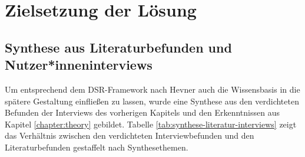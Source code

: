\section{Zielsetzung der Lösung}
\label{sec:Ergebnisse_Phase_zwei}

\subsection{Synthese aus Literaturbefunden und Nutzer*inneninterviews}
\label{subsec:Ergebnisse_Synthese}

Um entsprechend dem DSR-Framework nach Hevner \cite{hevner2004design} auch die Wissensbasis in die spätere Gestaltung einfließen zu lassen, wurde eine Synthese aus den verdichteten Befunden der Interviews des vorherigen Kapitels und den Erkenntnissen aus Kapitel \ref{chapter:theory} gebildet. Tabelle \ref{tab:synthese-literatur-interviews} zeigt das Verhältnis zwischen den verdichteten Interviewbefunden und den Literaturbefunden gestaffelt nach Synthesethemen.

